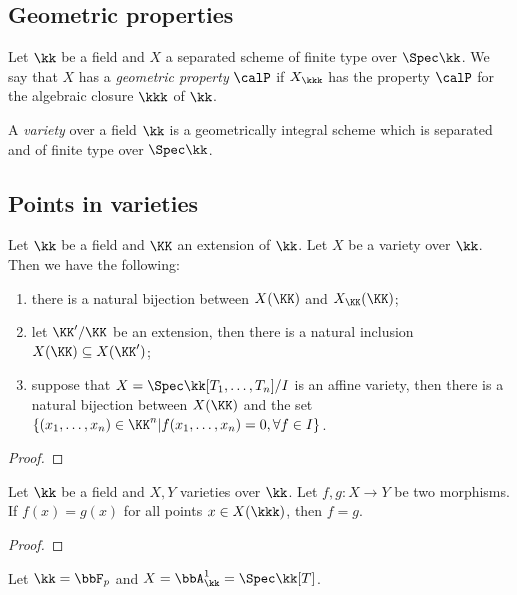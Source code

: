 \subsection{Geometric properties}

    \begin{definition}\label{def:geometrically_property}
        Let \(\kk\) be a field and \(X\) a separated scheme of finite type over \(\Spec \kk\).
        We say that \(X\) has a \emph{geometric property} \(\calP\) if \(X_{\kkk}\) has the property \(\calP\) for the algebraic closure \(\kkk\) of \(\kk\).
    \end{definition}

    \begin{definition}\label{def:varieties_over_general_field}
        A \emph{variety} over a field \(\kk\) is a geometrically integral scheme which is separated and of finite type over \(\Spec \kk\).
    \end{definition}


\subsection{Points in varieties}

    \begin{proposition}\label{prop:points_in_varieties_and_extension_of_base_field}
        Let \(\kk\) be a field and \(\KK\) an extension of \(\kk\).
        Let \(X\) be a variety over \(\kk\).
        Then we have the following:
        \begin{enumerate}
            \item there is a natural bijection between \(X(\KK)\) and \(X_\KK(\KK)\);
            \item let \(\KK'/\KK\) be an extension, then there is a natural inclusion \(X(\KK) \subseteq X(\KK')\);
            \item suppose that \(X = \Spec \kk[T_1,\ldots,T_n]/I\) is an affine variety, then there is a natural bijection between \(X(\KK)\) and the set \(\{(x_1,\ldots,x_n) \in \KK^n | f(x_1,\ldots,x_n) = 0, \forall f \in I\}\).
        \end{enumerate}
    \end{proposition}
    \begin{proof}
    \end{proof}

    \begin{proposition}\label{prop:closed_points_determines_morphism}
        Let \(\kk\) be a field and \(X,Y\) varieties over \(\kk\).
        Let \(f,g : X \to Y\) be two morphisms.
        If \(f(x) = g(x)\) for all points \(x \in X(\kkk)\), then \(f = g\).
    \end{proposition}
    \begin{proof}
    \end{proof}

    \begin{example}\label{eg:relative_Frobenius_of_affine_line_does_not_coincide_with_identity_on_closed_points}
        Let \(\kk = \bbF_p\) and \(X = \bbA^1_\kk = \Spec \kk[T]\).
    \end{example}
